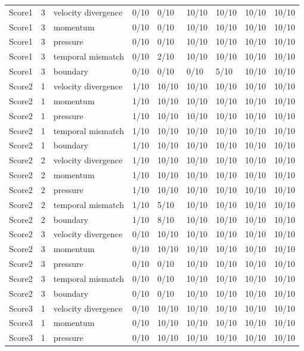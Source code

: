 \begin{longtable}{lllllllll}
Score1 & 3 & velocity divergence & 0/10 & 0/10 & 10/10 & 10/10 & 10/10 & 10/10 \\
Score1 & 3 & momentum & 0/10 & 0/10 & 10/10 & 10/10 & 10/10 & 10/10 \\
Score1 & 3 & pressure & 0/10 & 0/10 & 10/10 & 10/10 & 10/10 & 10/10 \\
Score1 & 3 & temporal mismatch & 0/10 & 2/10 & 10/10 & 10/10 & 10/10 & 10/10 \\
Score1 & 3 & boundary & 0/10 & 0/10 & 0/10 & 5/10 & 10/10 & 10/10 \\
Score2 & 1 & velocity divergence & 1/10 & 10/10 & 10/10 & 10/10 & 10/10 & 10/10 \\
Score2 & 1 & momentum & 1/10 & 10/10 & 10/10 & 10/10 & 10/10 & 10/10 \\
Score2 & 1 & pressure & 1/10 & 10/10 & 10/10 & 10/10 & 10/10 & 10/10 \\
Score2 & 1 & temporal mismatch & 1/10 & 10/10 & 10/10 & 10/10 & 10/10 & 10/10 \\
Score2 & 1 & boundary & 1/10 & 10/10 & 10/10 & 10/10 & 10/10 & 10/10 \\
Score2 & 2 & velocity divergence & 1/10 & 10/10 & 10/10 & 10/10 & 10/10 & 10/10 \\
Score2 & 2 & momentum & 1/10 & 10/10 & 10/10 & 10/10 & 10/10 & 10/10 \\
Score2 & 2 & pressure & 1/10 & 10/10 & 10/10 & 10/10 & 10/10 & 10/10 \\
Score2 & 2 & temporal mismatch & 1/10 & 5/10 & 10/10 & 10/10 & 10/10 & 10/10 \\
Score2 & 2 & boundary & 1/10 & 8/10 & 10/10 & 10/10 & 10/10 & 10/10 \\
Score2 & 3 & velocity divergence & 0/10 & 10/10 & 10/10 & 10/10 & 10/10 & 10/10 \\
Score2 & 3 & momentum & 0/10 & 10/10 & 10/10 & 10/10 & 10/10 & 10/10 \\
Score2 & 3 & pressure & 0/10 & 0/10 & 10/10 & 10/10 & 10/10 & 10/10 \\
Score2 & 3 & temporal mismatch & 0/10 & 0/10 & 10/10 & 10/10 & 10/10 & 10/10 \\
Score2 & 3 & boundary & 0/10 & 0/10 & 10/10 & 10/10 & 10/10 & 10/10 \\
Score3 & 1 & velocity divergence & 0/10 & 10/10 & 10/10 & 10/10 & 10/10 & 10/10 \\
Score3 & 1 & momentum & 0/10 & 10/10 & 10/10 & 10/10 & 10/10 & 10/10 \\
Score3 & 1 & pressure & 0/10 & 10/10 & 10/10 & 10/10 & 10/10 & 10/10 \\

\end{longtable}
